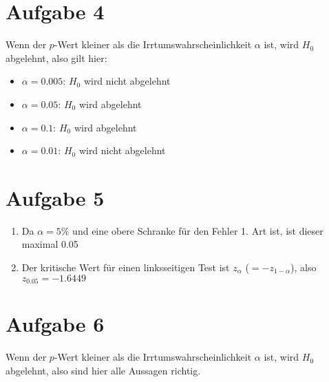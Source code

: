 \documentclass{article}
\begin{document}
	\section*{Aufgabe 4}
	Wenn der $p$-Wert kleiner als die Irrtumswahrscheinlichkeit $\alpha$ ist, wird $H_0$ abgelehnt, also gilt hier:
	\begin{itemize}
		\item $\alpha=0.005$: $H_0$ wird nicht abgelehnt
		\item $\alpha=0.05$: $H_0$ wird abgelehnt
		\item $\alpha=0.1$: $H_0$ wird abgelehnt
		\item $\alpha=0.01$: $H_0$ wird nicht abgelehnt
 	\end{itemize}

	\section*{Aufgabe 5}
	\begin{enumerate}[label=(\alph*)]
		\item Da $\alpha=5\%$ und eine obere Schranke für den Fehler 1. Art ist, ist dieser maximal 0.05
		\item Der kritische Wert für einen linksseitigen Test ist $z_\alpha$ ($=-z_{1-\alpha}$), also $z_{0.05}=-1.6449$
	\end{enumerate}
	
	\section*{Aufgabe 6}
	Wenn der $p$-Wert kleiner als die Irrtumswahrscheinlichkeit $\alpha$ ist, wird $H_0$ abgelehnt, also sind hier alle Aussagen richtig.
	
\end{document}
